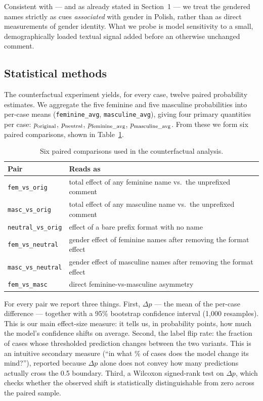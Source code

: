\documentclass[11pt,a4paper]{article}
\begin{document}
Consistent with \citet{Devinney2022} --- and as already stated in Section~1 --- we treat the gendered names strictly as cues \textit{associated} with gender in Polish, rather than as direct measurements of gender identity. What we probe is model sensitivity to a small, demographically loaded textual signal added before an otherwise unchanged comment.

\subsection{Statistical methods}
\label{sec:stat-methods}

The counterfactual experiment yields, for every case, twelve paired probability estimates. We aggregate the five feminine and five masculine probabilities into per-case means (\texttt{feminine\_avg}, \texttt{masculine\_avg}), giving four primary quantities per case: $p_{\textnormal{original}}$, $p_{\textnormal{neutral}}$, $p_{\textnormal{feminine\_avg}}$, $p_{\textnormal{masculine\_avg}}$. From these we form six paired comparisons, shown in Table~\ref{tab:cf-pairs}.

\begin{table}[h]
\centering
\small
\begin{tabular}{ll}
\toprule
Pair & Reads as \\
\midrule
\texttt{fem\_vs\_orig} & total effect of any feminine name vs.\ the unprefixed comment \\
\texttt{masc\_vs\_orig} & total effect of any masculine name vs.\ the unprefixed comment \\
\texttt{neutral\_vs\_orig} & effect of a bare prefix format with no name \\
\texttt{fem\_vs\_neutral} & gender effect of feminine names after removing the format effect \\
\texttt{masc\_vs\_neutral} & gender effect of masculine names after removing the format effect \\
\texttt{fem\_vs\_masc} & direct feminine-vs-masculine asymmetry \\
\bottomrule
\end{tabular}
\caption{Six paired comparisons used in the counterfactual analysis.}
\label{tab:cf-pairs}
\end{table}

For every pair we report three things. First, $\Delta p$ --- the mean of the per-case difference --- together with a 95\% bootstrap confidence interval (1,000 resamples). This is our main effect-size measure: it tells us, in probability points, how much the model's confidence shifts on average. Second, the label flip rate: the fraction of cases whose thresholded prediction changes between the two variants. This is an intuitive secondary measure (``in what \% of cases does the model change its mind?''), reported because $\Delta p$ alone does not convey how many predictions actually cross the 0.5 boundary. Third, a Wilcoxon signed-rank test on $\Delta p$, which checks whether the observed shift is statistically distinguishable from zero across the paired sample.
\end{document}
